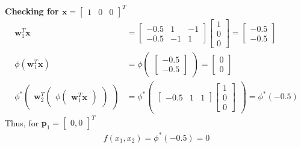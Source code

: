 \textbf{Checking for $\textbf{x} = \begin{bmatrix} 1 & 0 & 0 \end{bmatrix}^T$}
\begin{align*}
  \textbf{w}_1^T\textbf{x} &= \begin{bmatrix}
    -0.5 & 1 & -1 \\
    -0.5 & -1 & 1 
  \end{bmatrix} \begin{bmatrix}
    1\\
    0 \\
    0
  \end{bmatrix} = \begin{bmatrix}
    -0.5 \\
    -0.5
  \end{bmatrix} \\
  \phi(\textbf{w}_1^T\textbf{x}) &= \phi\begin{pmatrix}
    \begin{bmatrix}
      -0.5 \\
      -0.5
    \end{bmatrix}
  \end{pmatrix} = \begin{bmatrix}
    0 \\
    0
  \end{bmatrix} \\
  \phi^{*} \begin{pmatrix}
    \textbf{w}_2^T 
    \begin{pmatrix}
      \phi \begin{pmatrix}
        \textbf{w}_1^T\textbf{x}
    \end{pmatrix}  
  \end{pmatrix}
  \end{pmatrix} &= \phi^{*}\begin{pmatrix}
    \begin{bmatrix}
      -0.5 & 1 & 1
    \end{bmatrix} \begin{bmatrix}
      1 \\ 
      0 \\
      0
    \end{bmatrix}
  \end{pmatrix} = \phi^{*}(-0.5)
\end{align*}
Thus, for $\textbf{p}_1 = \begin{bmatrix}
  0,0
\end{bmatrix}^T$
\begin{align*}
  f(x_1,x_2) = \phi^{*} (-0.5) = 0
\end{align*}

